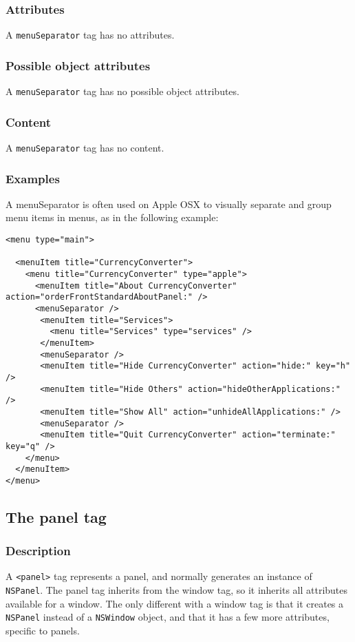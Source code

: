 \subsubsection{Attributes}
A \texttt{menuSeparator} tag has no attributes.

\subsubsection{Possible object attributes}
A \texttt{menuSeparator} tag has no possible object attributes.

\subsubsection{Content}
A \texttt{menuSeparator} tag has no content.

\subsubsection{Examples}
A menuSeparator is often used on Apple OSX to visually separate and
group menu items in menus, as in the following example:
\begin{verbatim}
<menu type="main">

  <menuItem title="CurrencyConverter">
    <menu title="CurrencyConverter" type="apple">
      <menuItem title="About CurrencyConverter" action="orderFrontStandardAboutPanel:" />
      <menuSeparator />
       <menuItem title="Services">
         <menu title="Services" type="services" />
       </menuItem>
       <menuSeparator />
       <menuItem title="Hide CurrencyConverter" action="hide:" key="h" />
       <menuItem title="Hide Others" action="hideOtherApplications:" />
       <menuItem title="Show All" action="unhideAllApplications:" />
       <menuSeparator />
       <menuItem title="Quit CurrencyConverter" action="terminate:" key="q" />
    </menu>
  </menuItem>
</menu>
\end{verbatim}

\subsection{The panel tag}

\subsubsection{Description}
A \texttt{<panel>} tag represents a panel, and normally generates an
instance of \texttt{NSPanel}.  The panel tag inherits from the window
tag, so it inherits all attributes available for a window.  The only
different with a window tag is that it creates a \texttt{NSPanel}
instead of a \texttt{NSWindow} object, and that it has a few more
attributes, specific to panels.

